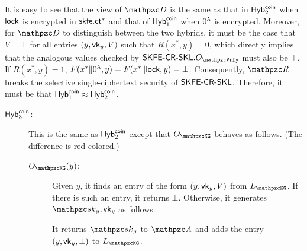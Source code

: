 It is easy to see that the view of $\qD$ is the same as that in
$\mathsf{Hyb}^{\mathsf{coin}}_2$ when $\mathsf{lock}$ is encrypted in $\mathsf{skfe}.\mathsf{ct}^*$ and that
of $\mathsf{Hyb}^{\mathsf{coin}}_1$ when $0^\lambda$ is encrypted. Moreover, for $\qD$
to distinguish between the two hybrids, it must be the case that
$V = \top$ for all entries $(y, \mathsf{vk}_y, V)$ such that $R(x^*, y) =
0$, which directly implies that the analogous values checked by
$\SKFESKL.\Oracle{\qVrfy}$ must also be $\top$. If $R(x^*,y)=1$, $F(x^*\| 0^\lambda,y)=F(x^*\| \mathsf{lock},y)=\bot$.  Consequently,
$\qR$ breaks the selective single-ciphertext security of $\mathsf{SKFE}\textrm{-}\mathsf{CR}\textrm{-}\mathsf{SKL}$. Therefore, it
must be that $\mathsf{Hyb}_1^{\mathsf{coin}} \approx \mathsf{Hyb}_2^{\mathsf{coin}}$.

\begin{description}
\item[$\mathsf{Hyb}_{3}^{\mathsf{coin}}$:]This is the same as $\mathsf{Hyb}_{2}^{\mathsf{coin}}$ except that $\Oracle{\qKG}$ behaves as follows. (The difference is red colored.)

\begin{description}
\item[$\Oracle{\qKG}(y)$:]Given $y$, it finds an entry of the form
$(y,\mathsf{vk}_y,V)$ from $\List{\qKG}$. If there is such an entry, it
returns $\bot$. Otherwise, it generates $\qsk_y, \vk_y$ as follows.

It returns $\qsk_y$ to $\qA$ and adds the entry $(y,\mathsf{vk}_y,\bot)$ to $\List{\qKG}$.
\end{description}
\end{description}

